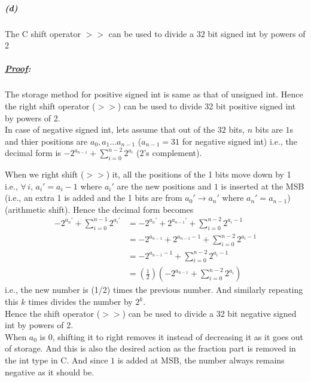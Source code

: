 \documentclass[12pt, letterpaper]{article}
\begin{document}
\subparagraph{(d)} The C shift operator $>>$ can be used to divide a $32$ bit signed int by powers of 2
\subparagraph{\textit{\underline{Proof}:}}

The storage method for positive signed int is same as that of unsigned int. Hence the right shift operator ($>>$) can be used to divide 32 bit positive signed int by powers of 2.\\

In case of negative signed int, lets assume that out of the $32$ bits, $n$ bits are $1$s and thier positions are $a_0,a_1 ...a_{n-1}$ ($a_{n-1} = 31$ for negative signed int) i.e., the decimal form is $-2^{a_{n-1}} + \sum_{i=0}^{n-2}2^{a_i}$ (2's complement).

When we right shift ($>>$) it, all the positions of the 1 bits move down by 1 i.e., $\forall\, i,\,a_i' = a_i - 1$  where $a_i'$ are the new positions and $1$ is inserted at the MSB (i.e., an extra 1 is added and the 1 bits are from $a_0' \to a_n'$ where $a_n' = a_{n-1}$) (arithmetic shift).
Hence the decimal form becomes
\[\begin{split}
-2^{a_n'} + \sum_{i=0}^{n-1}2^{a_i'}
&= -2^{a_n'} + 2^{a_{n-1}'} + \sum_{i=0}^{n-2}2^{a_i - 1}\\
&= -2^{a_{n-1}} + 2^{a_{n-1} - 1} + \sum_{i=0}^{n-2}2^{a_i - 1}\\
&= -2^{a_{n-1} - 1} + \sum_{i=0}^{n-2}2^{a_i - 1}\\
&= \boxed{\left(\frac{1}{2}\right)\left(-2^{a_{n-1}} + \sum_{i=0}^{n-2}2^{a_i}\right)}
\end{split}\]
i.e., the new number is (1/2) times the previous number.
And similarly repeating this $k$ times divides the number by $2^k$.\\

Hence the shift operator ($>>$) can be used to divide a 32 bit negative signed int by powers of 2.\\

When $a_{0}$ is $0$, shifting it to right removes it instead of decreasing it as it goes out of storage. And this is also the desired action as the fraction part is removed in the int type in C. And since $1$ is added at MSB, the number always remains negative as it should be.
\end{document}
